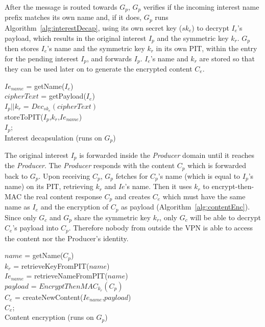 After the message is routed towards $G_p$, $G_p$ verifies if the incoming interest name prefix
matches its own name and, if it does, $G_p$ runs Algorithm~\ref{alg:interestDecap}, using its own
secret key ($sk_e$) to decrypt $I_e$'s payload, which results in the original interest $I_p$ and
the symmetric key $k_r$. $G_p$ then stores $I_e$'s name and the symmetric key $k_r$ in its own PIT,
within the entry for the pending interest $I_p$, and forwards $I_p$. $I_e$'s name and $k_r$ are
stored so that they can be used later on to generate the encrypted content $C_e$.

\begin{algorithm}\label{alg:interestDecap}
$Ie_{name}$ = getName($I_e$)\\
$cipherText$ = getPayload($I_e$)\\
$I_p||k_r$ = $Dec_{sk_e}(cipherText)$\\
storeToPIT($I_p$,$k_r$,$Ie_{name}$)\\
\Return $I_p$;\\
\caption{Interest decapsulation (runs on $G_p$)}
\end{algorithm}

The original interest $I_p$ is forwarded inside the \textit{Producer} domain until it reaches
the \textit{Producer}. The \textit{Producer} responds with the content $C_p$ which is forwarded back to $G_p$.
Upon receiving $C_p$, $G_p$ fetches for $C_p$'s name (which is equal to $I_p$'s name) on its
PIT, retrieving $k_r$ and $Ie$'s name. Then it uses $k_r$ to encrypt-then-MAC the real content
response $C_p$ and creates $C_e$ which must have the same name as $I_e$ and the encryption of
$C_p$ as payload (Algorithm~\ref{alg:contentEnc}). Since only $G_c$ and $G_p$ share the
symmetric key $k_r$, only $G_c$ will be able to decrypt $C_e$'s payload into $C_p$. Therefore
nobody from outside the VPN is able to access the content nor the Producer's identity.

\begin{algorithm}\label{alg:contentEnc}
$name$ = getName($C_p$)\\
$k_r$ = retrieveKeyFromPIT($name$)\\
$Ie_{name}$ = retrieveNameFromPIT($name$)\\
$payload$ = $EncryptThenMAC_{k_r}(C_p)$\\
$C_e$ = createNewContent($Ie_{name}$,$payload$)\\
\Return $C_e$;\\
\caption{Content encryption  (runs on $G_p$)}
\end{algorithm}

